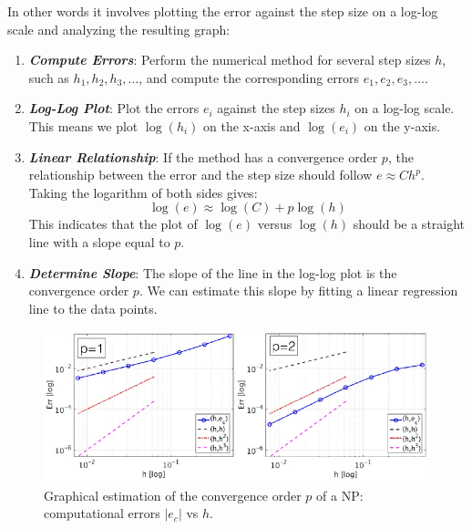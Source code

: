 \begin{enumerate}
    In other words it involves plotting the error against the step size on a log-log scale and analyzing the resulting graph:
    \begin{enumerate}
        \item \emph{\textbf{Compute Errors}}: Perform the numerical method for several step sizes $h$, such as $ h_{1}, h_{2}, h_{3}, \dots $, and compute the corresponding errors $ e_{1}, e_{2}, e_{3}, \dots $.

        \item \emph{\textbf{Log-Log Plot}}: Plot the errors $e_{i}$ against the step sizes $h_{i}$ on a log-log scale. This means we plot $\log\left(h_{i}\right)$ on the x-axis and $\log\left(e_{i}\right)$ on the y-axis.

        \item \emph{\textbf{Linear Relationship}}: If the method has a convergence order $p$, the relationship between the error and the step size should follow $e \approx C h^p $. Taking the logarithm of both sides gives:
        \begin{equation*}
            \log\left(e\right) \approx \log\left(C\right) + p \log\left(h\right)
        \end{equation*}
        This indicates that the plot of $\log\left(e\right)$ versus $\log\left(h\right)$ should be a straight line with a slope equal to $p$.

        \item \emph{\textbf{Determine Slope}}: The slope of the line in the log-log plot is the convergence order $p$. We can estimate this slope by fitting a linear regression line to the data points.
    \end{enumerate}

    \begin{figure}[!htp]
        \centering
        \includegraphics[width=\textwidth]{img/graphical-estimate-1.pdf}
        \caption{Graphical estimation of the convergence order $p$ of a NP: computational errors $\left|e_{c}\right|$ vs $h$.}
    \end{figure}
\end{enumerate}

